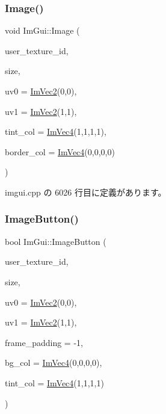 \subsubsection{\texorpdfstring{Image()}{Image()}}
{\footnotesize\ttfamily void Im\+Gui\+::\+Image (\begin{DoxyParamCaption}\item[{\mbox{\hyperlink{imgui_8h_a364f4447ecbc4ca176145ccff9db6286}{Im\+Texture\+ID}}}]{user\+\_\+texture\+\_\+id,  }\item[{const \mbox{\hyperlink{struct_im_vec2}{Im\+Vec2}} \&}]{size,  }\item[{const \mbox{\hyperlink{struct_im_vec2}{Im\+Vec2}} \&}]{uv0 = {\ttfamily \mbox{\hyperlink{struct_im_vec2}{Im\+Vec2}}(0,0)},  }\item[{const \mbox{\hyperlink{struct_im_vec2}{Im\+Vec2}} \&}]{uv1 = {\ttfamily \mbox{\hyperlink{struct_im_vec2}{Im\+Vec2}}(1,1)},  }\item[{const \mbox{\hyperlink{struct_im_vec4}{Im\+Vec4}} \&}]{tint\+\_\+col = {\ttfamily \mbox{\hyperlink{struct_im_vec4}{Im\+Vec4}}(1,1,1,1)},  }\item[{const \mbox{\hyperlink{struct_im_vec4}{Im\+Vec4}} \&}]{border\+\_\+col = {\ttfamily \mbox{\hyperlink{struct_im_vec4}{Im\+Vec4}}(0,0,0,0)} }\end{DoxyParamCaption})}



 imgui.\+cpp の 6026 行目に定義があります。

\mbox{\label{namespace_im_gui_ac79ef64e8b9e1db73d8237f6a999da14}} 
\subsubsection{\texorpdfstring{Image\+Button()}{ImageButton()}}
{\footnotesize\ttfamily bool Im\+Gui\+::\+Image\+Button (\begin{DoxyParamCaption}\item[{\mbox{\hyperlink{imgui_8h_a364f4447ecbc4ca176145ccff9db6286}{Im\+Texture\+ID}}}]{user\+\_\+texture\+\_\+id,  }\item[{const \mbox{\hyperlink{struct_im_vec2}{Im\+Vec2}} \&}]{size,  }\item[{const \mbox{\hyperlink{struct_im_vec2}{Im\+Vec2}} \&}]{uv0 = {\ttfamily \mbox{\hyperlink{struct_im_vec2}{Im\+Vec2}}(0,0)},  }\item[{const \mbox{\hyperlink{struct_im_vec2}{Im\+Vec2}} \&}]{uv1 = {\ttfamily \mbox{\hyperlink{struct_im_vec2}{Im\+Vec2}}(1,1)},  }\item[{int}]{frame\+\_\+padding = {\ttfamily -\/1},  }\item[{const \mbox{\hyperlink{struct_im_vec4}{Im\+Vec4}} \&}]{bg\+\_\+col = {\ttfamily \mbox{\hyperlink{struct_im_vec4}{Im\+Vec4}}(0,0,0,0)},  }\item[{const \mbox{\hyperlink{struct_im_vec4}{Im\+Vec4}} \&}]{tint\+\_\+col = {\ttfamily \mbox{\hyperlink{struct_im_vec4}{Im\+Vec4}}(1,1,1,1)} }\end{DoxyParamCaption})}



